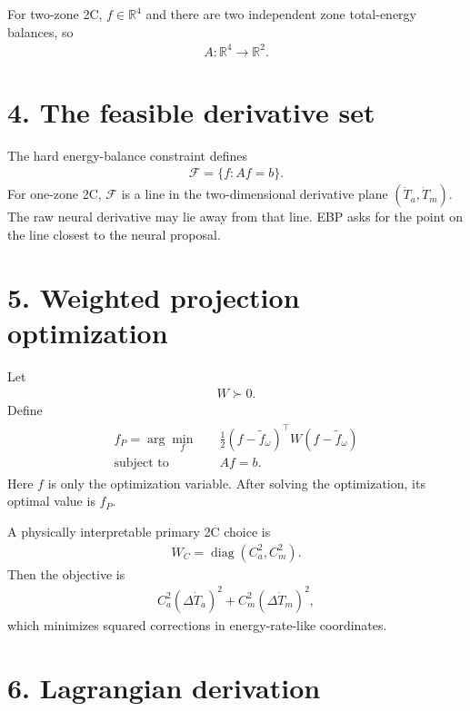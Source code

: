 \documentclass[11pt]{article}
\begin{document}
For two-zone 2C, \(f\in\mathbb R^4\) and there are two independent zone total-energy balances, so
\begin{align}
\boxed{A:\mathbb R^4\rightarrow\mathbb R^2.}
\tag{E5.19}
\end{align}

\section*{4. The feasible derivative set}

The hard energy-balance constraint defines
\begin{align}
\boxed{\mathcal F=\{f:Af=b\}.}
\tag{E5.20}
\end{align}
For one-zone 2C, \(\mathcal F\) is a line in the two-dimensional derivative plane \((\dot T_a,\dot T_m)\). The raw neural derivative may lie away from that line. EBP asks for the point on the line closest to the neural proposal.

\section*{5. Weighted projection optimization}

Let
\begin{align}
\boxed{W\succ0.}
\tag{E5.21}
\end{align}
Define
\begin{align}
\boxed{
\begin{aligned}
f_P=\arg\min_f\quad&\frac12(f-\widetilde f_\omega)^\top W(f-\widetilde f_\omega)\\
\text{subject to}\quad&Af=b.
\end{aligned}}
\tag{E5.22}
\end{align}
Here \(f\) is only the optimization variable. After solving the optimization, its optimal value is \(f_P\).

A physically interpretable primary 2C choice is
\begin{align}
\boxed{W_C=\operatorname{diag}(C_a^2,C_m^2).}
\tag{E5.23}
\end{align}
Then the objective is
\begin{align}
\boxed{C_a^2(\Delta\dot T_a)^2+C_m^2(\Delta\dot T_m)^2,}
\tag{E5.24}
\end{align}
which minimizes squared corrections in energy-rate-like coordinates.

\section*{6. Lagrangian derivation}
\end{document}
